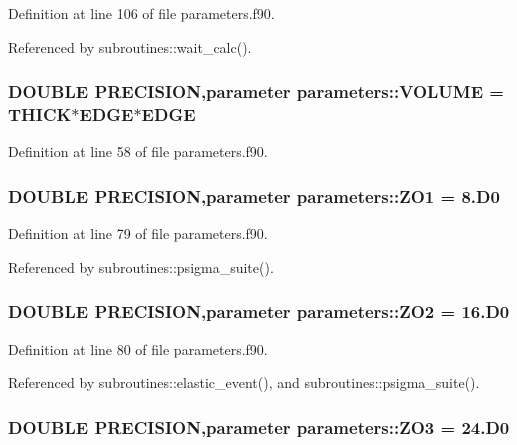 Definition at line 106 of file parameters.f90.

Referenced by subroutines::wait\_\-calc().\hypertarget{namespaceparameters_a8a887d07bb62f10ae5578c2a7181a578}{
\subsubsection[{VOLUME}]{\setlength{\rightskip}{0pt plus 5cm}DOUBLE PRECISION,parameter {\bf parameters::VOLUME} = {\bf THICK}$\ast${\bf EDGE}$\ast${\bf EDGE}}}
\label{namespaceparameters_a8a887d07bb62f10ae5578c2a7181a578}


Definition at line 58 of file parameters.f90.\hypertarget{namespaceparameters_a1c9d90c36ce0be5595ed197469b6e609}{
\subsubsection[{ZO1}]{\setlength{\rightskip}{0pt plus 5cm}DOUBLE PRECISION,parameter {\bf parameters::ZO1} = 8.D0}}
\label{namespaceparameters_a1c9d90c36ce0be5595ed197469b6e609}


Definition at line 79 of file parameters.f90.

Referenced by subroutines::psigma\_\-suite().\hypertarget{namespaceparameters_a885e127ecd6c6a8469ca5ed6aba4badf}{
\subsubsection[{ZO2}]{\setlength{\rightskip}{0pt plus 5cm}DOUBLE PRECISION,parameter {\bf parameters::ZO2} = 16.D0}}
\label{namespaceparameters_a885e127ecd6c6a8469ca5ed6aba4badf}


Definition at line 80 of file parameters.f90.

Referenced by subroutines::elastic\_\-event(), and subroutines::psigma\_\-suite().\hypertarget{namespaceparameters_ac4b8f44af44db753a988dc78c534c94d}{
\subsubsection[{ZO3}]{\setlength{\rightskip}{0pt plus 5cm}DOUBLE PRECISION,parameter {\bf parameters::ZO3} = 24.D0}}
\label{namespaceparameters_ac4b8f44af44db753a988dc78c534c94d}


